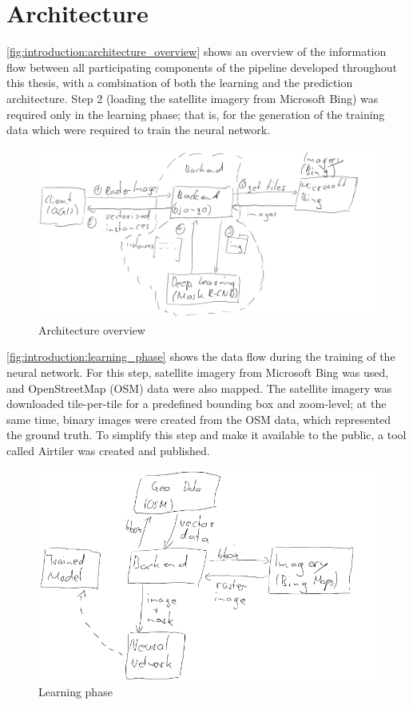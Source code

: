 \section{Architecture}
\autoref{fig:introduction:architecture_overview} shows an overview of the information flow between all participating components of the pipeline developed throughout this thesis, with a combination of both the learning and the prediction architecture. Step 2 (loading the satellite imagery from Microsoft Bing) was required only in the learning phase; that is, for the generation of the training data which were required to train the neural network.

\begin{figure}[H]
    \centering
	\includegraphics[width=0.9\linewidth]{chapters/introduction/images/overview.png}
	\caption{Architecture overview}
	\label{fig:introduction:architecture_overview}
\end{figure}

\autoref{fig:introduction:learning_phase} shows the data flow during the training of the neural network. For this step, satellite imagery from Microsoft Bing was used, and OpenStreetMap (OSM) data were also mapped. The satellite imagery was downloaded tile-per-tile for a predefined bounding box and zoom-level; at the same time, binary images were created from the OSM data, which represented the ground truth. To simplify this step and make it available to the public, a tool called Airtiler \cite{airtiler} was created and published.

\begin{figure}[H]
    \centering
	\includegraphics[width=0.9\linewidth]{chapters/introduction/images/learning_phase.png}
	\caption{Learning phase}
	\label{fig:introduction:learning_phase}
\end{figure}

